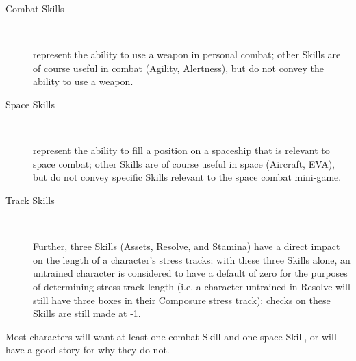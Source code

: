 \begin{description}
\item[Combat Skills]~

represent the ability to use a weapon in personal combat; other Skills are of course useful in combat (Agility, Alertness), but do not convey the ability to use a weapon.

\item[Space Skills]~

represent the ability to fill a position on a spaceship that is relevant to space combat; other Skills are of course useful in space (Aircraft, EVA), but do not convey specific Skills relevant to the space combat mini-game.

\item[Track Skills]~

Further, three Skills (Assets, Resolve, and Stamina) have a direct impact on the length of a character's stress tracks: with these three Skills alone, an untrained character is considered to have a default of zero for the purposes of determining stress track length (i.e. a character untrained in Resolve will still have three boxes in their Composure stress track); checks on these Skills are still made at -1.
\end{description}

Most characters will want at least one combat Skill and one space Skill, or will have a good story for why they do not.





